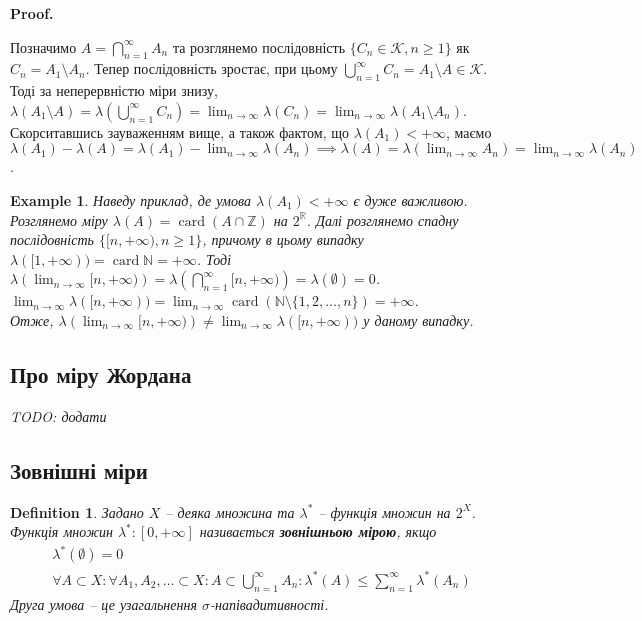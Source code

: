 \documentclass[a4paper, 10pt]{article}
\makeatletter
\theoremstyle{theoremdd}
\newtheorem{definition}[theorem]{Definition}
\newtheorem{example}[theorem]{Example}
\DeclareMathOperator{\card}{card}
\renewenvironment{proof}[1][Proof.\\]{\par
\pushQED{\hfill \qed}%
\normalfont \topsep6\p@\@plus6\p@\relax
\trivlist
\item\relax
{\bfseries
#1\@addpunct{.}}\hspace\labelsep\ignorespaces
}{%
\popQED\endtrivlist\@endpefalse
}
\makeatother
\begin{document}
\begin{proof}
Позначимо $A = \displaystyle\bigcap_{n=1}^\infty A_n$ та розглянемо послідовність $\{C_n \in \mathcal{K}, n \geq 1\}$ як $C_n = A_1 \setminus A_n$. Тепер послідовність зростає, при цьому $\displaystyle\bigcup_{n=1}^\infty C_n = A_1 \setminus A \in \mathcal{K}$. Тоді за неперервністю міри знизу,\\
$\lambda(A_1 \setminus A) = \displaystyle\lambda\left( \bigcup_{n=1}^\infty C_n \right) = \lim_{n \to \infty} \lambda\left(C_n\right) = \lim_{n \to \infty} \lambda(A_1 \setminus A_n)$.\\
Скорситавшись зауваженням вище, а також фактом, що $\lambda(A_1) < +\infty$, маємо\\
$\displaystyle\lambda(A_1) - \lambda(A) = \lambda(A_1) - \lim_{n \to \infty} \lambda(A_n) \implies \lambda(A) = \lambda\left( \lim_{n \to \infty} A_n \right) = \lim_{n \to \infty} \lambda(A_n)$.
\end{proof}

\begin{example}
Наведу приклад, де умова $\lambda(A_1) < +\infty$ є дуже важливою.\\
Розглянемо міру $\lambda(A) = \card (A \cap \mathbb{Z})$ на $2^{\mathbb{R}}$. Далі розглянемо спадну послідовність $\{ [n,+\infty), n \geq 1 \}$, причому в цьому випадку $\lambda([1,+\infty)) = \card \mathbb{N} = +\infty$. Тоді\\
$\displaystyle\lambda\left( \lim_{n \to \infty} [n,+\infty) \right) = \lambda\left( \bigcap_{n=1}^\infty [n,+\infty) \right) = \lambda(\emptyset) = 0$.\\
$\displaystyle\lim_{n \to \infty} \lambda([n,+\infty)) = \lim_{n \to \infty} \card (\mathbb{N} \setminus \{1,2,\dots,n\}) = +\infty$.\\
Отже, $\displaystyle\lambda\left( \lim_{n \to \infty} [n,+\infty) \right) \neq \lim_{n \to \infty} \lambda([n,+\infty))$ у даному випадку.
\end{example}

\subsection{Про міру Жордана}
\textit{TODO: додати}

\subsection{Зовнішні міри}
\begin{definition}
Задано $X$ -- деяка множина та $\lambda^*$ -- функція множин на $2^X$.\\
Функція множин $\lambda^* \colon [0,+\infty]$ називається \textbf{зовнішньою мірою}, якщо
\begin{align*}
\lambda^*(\emptyset) = 0 \\
\forall A \subset X: \forall A_1,A_2,\dots \subset X: A \subset \displaystyle\bigcup_{n=1}^\infty A_n: \lambda^*(A) \leq \sum_{n=1}^\infty \lambda^*(A_n)
\end{align*}
Друга умова -- це узагальнення $\sigma$-напівадитивності.
\end{definition}
\end{document}
